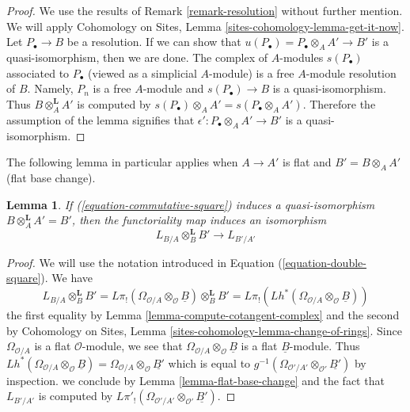 \documentclass{stacks-project}
\theoremstyle{plain}
\newtheorem{lemma}[subsection]{Lemma}
\theoremstyle{definition}
\theoremstyle{remark}
\numberwithin{equation}{subsection}
\begin{document}
\begin{proof}
We use the results of Remark \ref{remark-resolution} without
further mention. We will apply Cohomology on Sites, Lemma
\ref{sites-cohomology-lemma-get-it-now}. Let $P_\bullet \to B$ be a resolution.
If we can show that $u(P_\bullet) = P_\bullet \otimes_A A' \to B'$
is a quasi-isomorphism, then we are done. The complex of $A$-modules
$s(P_\bullet)$ associated to $P_\bullet$ (viewed as a simplicial $A$-module)
is a free $A$-module resolution of $B$. Namely, $P_n$ is a free $A$-module and
$s(P_\bullet) \to B$ is a quasi-isomorphism. Thus $B \otimes_A^\mathbf{L} A'$
is computed by $s(P_\bullet) \otimes_A A' = s(P_\bullet \otimes_A A')$.
Therefore the assumption of the lemma signifies that
$\epsilon' : P_\bullet \otimes_A A' \to B'$ is a quasi-isomorphism.
\end{proof}

\noindent
The following lemma in particular applies when $A \to A'$ is flat
and $B' = B \otimes_A A'$ (flat base change).

\begin{lemma}
\label{lemma-flat-base-change-cotangent-complex}
If (\ref{equation-commutative-square}) induces a quasi-isomorphism
$B \otimes_A^\mathbf{L} A' = B'$, then the functoriality map
induces an isomorphism
$$
L_{B/A} \otimes_B^\mathbf{L} B' \longrightarrow L_{B'/A'}
$$
\end{lemma}

\begin{proof}
We will use the notation introduced in Equation (\ref{equation-double-square}).
We have
$$
L_{B/A} \otimes_B^\mathbf{L} B' =
L\pi_!(\Omega_{\mathcal{O}/A} \otimes_\mathcal{O} \underline{B})
\otimes_B^\mathbf{L} B' =
L\pi_!(Lh^*(\Omega_{\mathcal{O}/A} \otimes_\mathcal{O} \underline{B}))
$$
the first equality by Lemma \ref{lemma-compute-cotangent-complex}
and the second by Cohomology on Sites, Lemma
\ref{sites-cohomology-lemma-change-of-rings}.
Since $\Omega_{\mathcal{O}/A}$ is a flat $\mathcal{O}$-module,
we see that $\Omega_{\mathcal{O}/A} \otimes_\mathcal{O} \underline{B}$
is a flat $\underline{B}$-module. Thus
$Lh^*(\Omega_{\mathcal{O}/A} \otimes_\mathcal{O} \underline{B}) =
\Omega_{\mathcal{O}/A} \otimes_\mathcal{O} \underline{B'}$
which is equal to
$g^{-1}(\Omega_{\mathcal{O}'/A'} \otimes_{\mathcal{O}'} \underline{B'})$
by inspection.
we conclude by Lemma \ref{lemma-flat-base-change}
and the fact that $L_{B'/A'}$ is computed by
$L\pi'_!(\Omega_{\mathcal{O}'/A'} \otimes_{\mathcal{O}'} \underline{B'})$.
\end{proof}
\end{document}

